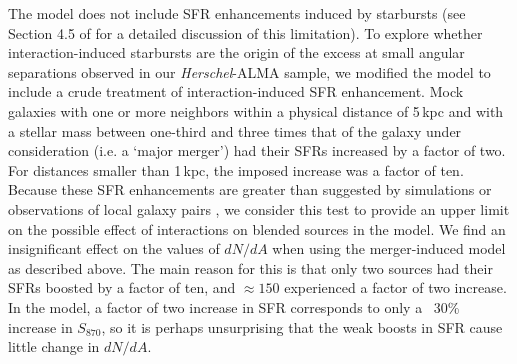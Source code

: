 \documentclass[iop]{emulateapj}
\begin{document}

The \citet{HB13} model does not include SFR enhancements induced by starbursts
(see Section 4.5 of \citealt{HB13} for a detailed discussion of this
limitation). To explore whether interaction-induced starbursts are the origin
of the excess at small angular separations observed in our {\it Herschel}-ALMA sample, we
modified the \citet{HB13} model to include a crude treatment of
interaction-induced SFR enhancement. Mock galaxies with one or more neighbors
within a physical distance of 5$\,$kpc and with a stellar mass between
one-third and three times that of the galaxy under consideration (i.e.  a
`major merger') had their SFRs increased by a factor of two. For distances
smaller than 1$\,$kpc, the imposed increase was a factor of ten.  Because these
SFR enhancements are greater than suggested by simulations \citep[e.g.][]{Cox08,
H11, H14, Torrey12} or observations of local galaxy pairs
\citep[e.g.][]{Scudder12, Patton13}, we consider this test to provide an upper
limit on the possible effect of interactions on blended sources in the
\citet{HB13} model.  We find an insignificant effect on the values of $dN/dA$
when using the merger-induced model as described above.  The main reason for
this is that only two sources had their SFRs boosted by a factor of ten, and
$\approx150$ experienced a factor of two increase. In the \citet{HB13} model, a
factor of two increase in SFR corresponds to only a ~30\% increase in
$S_{870}$, so it is perhaps unsurprising that the weak boosts in SFR cause
little change in $dN/dA$.
\end{document}
